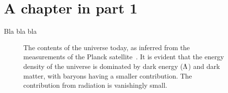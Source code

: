 \chapter{A chapter in part 1}
\label{chap:chap1}
Bla bla bla

\begin{figure}
	\centering
	\caption{The contents of the universe today, as inferred from the measurements of the Planck satellite~\cite{planckcollaborationPlanck2018Results2020}. It is evident that the energy density of the universe is dominated by dark energy ($\mathrm{\Lambda}$) and dark matter, with baryons having a smaller contribution. The contribution from radiation is vanishingly small.}
	\label{fig:PieToday}
\end{figure}